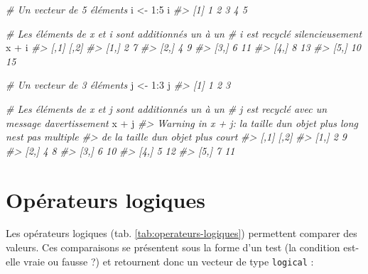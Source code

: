 \documentclass[
  french,
]{scrbook}
\newenvironment{Shaded}{\begin{snugshade}}{\end{snugshade}}
\newcommand{\CommentTok}[1]{\textcolor[rgb]{0.56,0.35,0.01}{\textit{#1}}}
\newcommand{\DecValTok}[1]{\textcolor[rgb]{0.00,0.00,0.81}{#1}}
\newcommand{\NormalTok}[1]{#1}
\newcommand{\OtherTok}[1]{\textcolor[rgb]{0.56,0.35,0.01}{#1}}
\newcommand{\SpecialCharTok}[1]{\textcolor[rgb]{0.00,0.00,0.00}{#1}}
\begin{document}
\begin{Shaded}
\begin{Highlighting}[]
\CommentTok{\# Un vecteur de 5 éléments}
\NormalTok{i }\OtherTok{\textless{}{-}} \DecValTok{1}\SpecialCharTok{:}\DecValTok{5}
\NormalTok{i}
\CommentTok{\#\textgreater{} [1] 1 2 3 4 5}

\CommentTok{\# Les éléments de x et i sont additionnés un à un}
\CommentTok{\# i est recyclé silencieusement}
\NormalTok{x }\SpecialCharTok{+}\NormalTok{ i}
\CommentTok{\#\textgreater{}      [,1] [,2]}
\CommentTok{\#\textgreater{} [1,]    2    7}
\CommentTok{\#\textgreater{} [2,]    4    9}
\CommentTok{\#\textgreater{} [3,]    6   11}
\CommentTok{\#\textgreater{} [4,]    8   13}
\CommentTok{\#\textgreater{} [5,]   10   15}

\CommentTok{\# Un vecteur de 3 éléments}
\NormalTok{j }\OtherTok{\textless{}{-}} \DecValTok{1}\SpecialCharTok{:}\DecValTok{3}
\NormalTok{j}
\CommentTok{\#\textgreater{} [1] 1 2 3}

\CommentTok{\# Les éléments de x et j sont additionnés un à un}
\CommentTok{\# j est recyclé avec un message d\textquotesingle{}avertissement}
\NormalTok{x }\SpecialCharTok{+}\NormalTok{ j}
\CommentTok{\#\textgreater{} Warning in x + j: la taille d\textquotesingle{}un objet plus long n\textquotesingle{}est pas multiple}
\CommentTok{\#\textgreater{} de la taille d\textquotesingle{}un objet plus court}
\CommentTok{\#\textgreater{}      [,1] [,2]}
\CommentTok{\#\textgreater{} [1,]    2    9}
\CommentTok{\#\textgreater{} [2,]    4    8}
\CommentTok{\#\textgreater{} [3,]    6   10}
\CommentTok{\#\textgreater{} [4,]    5   12}
\CommentTok{\#\textgreater{} [5,]    7   11}
\end{Highlighting}
\end{Shaded}

\hypertarget{opuxe9rateurs-logiques}{%
\section{Opérateurs logiques}\label{opuxe9rateurs-logiques}}

Les opérateurs logiques (tab. \ref{tab:operateurs-logiques}) permettent comparer des valeurs. Ces comparaisons se présentent sous la forme d'un test (la condition est-elle vraie ou fausse ?) et retournent donc un vecteur de type \texttt{logical} :
\end{document}
